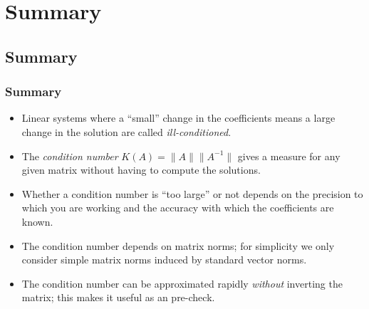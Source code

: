 \documentclass{beamer}
\begin{document}
 \section{Summary}

 \subsection{Summary}

 \begin{frame}
   \frametitle{Summary}

   \begin{itemize}
   \item Linear systems where a ``small'' change in the coefficients
     means a large change in the solution are called
     \emph{ill-conditioned}.
   \item The \emph{condition number} $K(A) = \| A \| \| A^{-1} \|$
     gives a measure for any given matrix without having to compute
     the solutions.
   \item Whether a condition number is ``too large'' or not depends on
     the precision to which you are working and the accuracy with
     which the coefficients are known.
   \item The condition number depends on matrix norms; for simplicity
     we only consider simple matrix norms induced by standard vector
     norms.
   \item The condition number can be approximated rapidly
     \emph{without} inverting the matrix; this makes it useful as an
     pre-check.
   \end{itemize}

 \end{frame}
\end{document}
